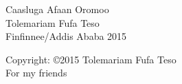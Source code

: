 \documentclass[11pt,b5paper]{book}
\begin{document}
\renewcommand\refname{Kitaabilee Wabii} 
\begin{titlepage}
\centering
\thispagestyle{empty}
{\Huge Caasluga Afaan Oromoo}\\
\vspace{3.0\baselineskip}
\vspace{3.0\baselineskip}
\vspace{3.0\baselineskip}
{\Large Tolemariam Fufa Teso}\\
\vspace{3.0\baselineskip}
\vspace{3.0\baselineskip}
\vspace{3.0\baselineskip}
\vspace{3.0\baselineskip}
\vspace{3.0\baselineskip}
\vspace{3.0\baselineskip}
{\small Finfinnee/Addis Ababa 2015}\\
\vspace{3.0\baselineskip}
\date{}
\end{titlepage}
\newpage

\thispagestyle{empty}
  Copyright: \copyright 2015 Tolemariam Fufa Teso\\

\newpage
\thispagestyle{empty}
For my friends

\newpage
\thispagestyle{empty}
\tableofcontents
\newpage
\end{document}
